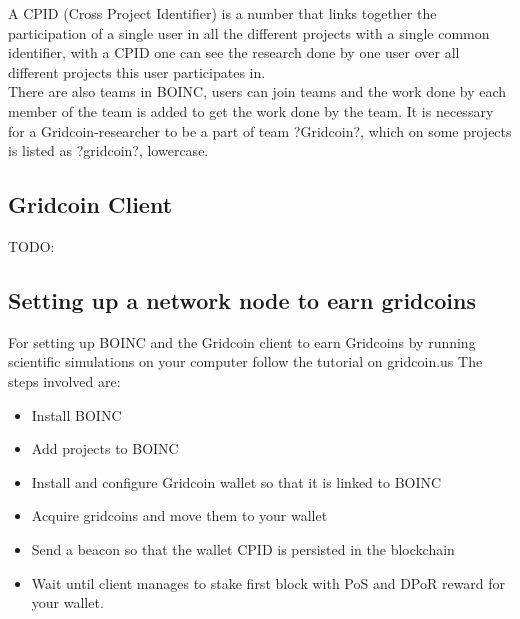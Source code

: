 A CPID (Cross Project Identifier) is a number that links together the participation of a single user in all the different projects with a single common identifier, with a CPID one can see the research done by one user over all different projects this user participates in.\\

There are also teams in BOINC, users can join teams and the work done by each member of the team is added to get the work done by the team. It is necessary for a Gridcoin-researcher to be a part of team ?Gridcoin?, which on some projects is listed as ?gridcoin?, lowercase.

\subsection{Gridcoin Client}

TODO: 

\subsection{Setting up a network node to earn gridcoins}

For setting up BOINC and the Gridcoin client to earn Gridcoins by running scientific simulations on your computer follow the tutorial on gridcoin.us
The steps involved are:
\begin{itemize}
  \item Install BOINC
  \item Add projects to BOINC
  \item Install and configure Gridcoin wallet so that it is linked to BOINC 
  \item Acquire gridcoins and move them to your wallet
  \item Send a beacon so that the wallet CPID is persisted in the blockchain
  \item Wait until client manages to stake first block with PoS and DPoR reward for your wallet.
\end{itemize}

